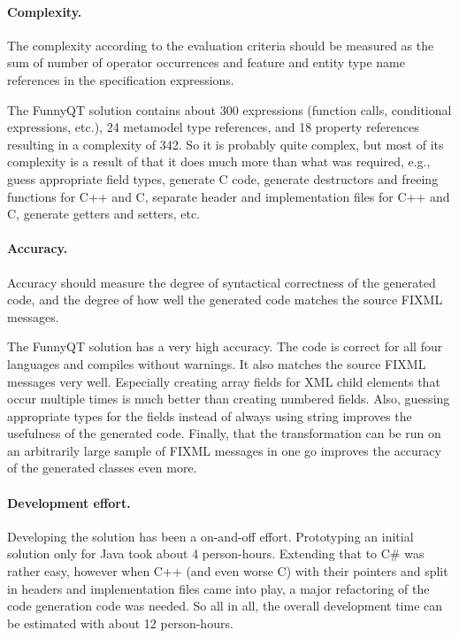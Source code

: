 \documentclass[a4paper]{article}
\begin{document}
\paragraph{Complexity.}
\label{sec:complexity}

The complexity according to the evaluation criteria should be measured as the
sum of number of operator occurrences and feature and entity type name
references in the specification expressions.

The FunnyQT solution contains about 300 expressions (function calls,
conditional expressions, etc.), 24 metamodel type references, and 18 property
references resulting in a complexity of 342.  So it is probably quite complex,
but most of its complexity is a result of that it does much more than what was
required, e.g., guess appropriate field types, generate C code, generate
destructors and freeing functions for C++ and C, separate header and
implementation files for C++ and C, generate getters and setters, etc.


\paragraph{Accuracy.}
\label{sec:accuracy}

Accuracy should measure the degree of syntactical correctness of the generated
code, and the degree of how well the generated code matches the source FIXML
messages.

The FunnyQT solution has a very high accuracy.  The code is correct for all
four languages and compiles without warnings.  It also matches the source FIXML
messages very well.  Especially creating array fields for XML child elements
that occur multiple times is much better than creating numbered fields.  Also,
guessing appropriate types for the fields instead of always using string
improves the usefulness of the generated code.  Finally, that the
transformation can be run on an arbitrarily large sample of FIXML messages in
one go improves the accuracy of the generated classes even more.

\paragraph{Development effort.}
\label{sec:development-effort}

Developing the solution has been a on-and-off effort.  Prototyping an initial
solution only for Java took about 4 person-hours.  Extending that to C\# was
rather easy, however when C++ (and even worse C) with their pointers and split
in headers and implementation files came into play, a major refactoring of the
code generation code was needed.  So all in all, the overall development time
can be estimated with about 12 person-hours.
\end{document}
